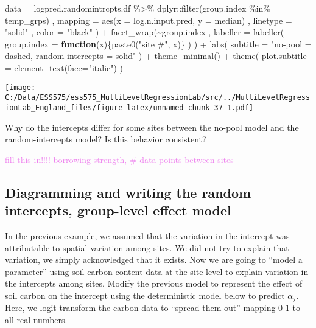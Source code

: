 \documentclass[
]{article}
\newenvironment{Shaded}{\begin{snugshade}}{\end{snugshade}}
\newcommand{\AttributeTok}[1]{\textcolor[rgb]{0.77,0.63,0.00}{#1}}
\newcommand{\ControlFlowTok}[1]{\textcolor[rgb]{0.13,0.29,0.53}{\textbf{#1}}}
\newcommand{\FunctionTok}[1]{\textcolor[rgb]{0.00,0.00,0.00}{#1}}
\newcommand{\NormalTok}[1]{#1}
\newcommand{\SpecialCharTok}[1]{\textcolor[rgb]{0.00,0.00,0.00}{#1}}
\newcommand{\StringTok}[1]{\textcolor[rgb]{0.31,0.60,0.02}{#1}}
\begin{document}
\begin{Shaded}
\begin{Highlighting}[]
    \AttributeTok{data =}\NormalTok{ logpred.randomintrcpts.df }\SpecialCharTok{\%\textgreater{}\%}\NormalTok{ dplyr}\SpecialCharTok{::}\FunctionTok{filter}\NormalTok{(group.index }\SpecialCharTok{\%in\%}\NormalTok{ temp\_grps)}
\NormalTok{    , }\AttributeTok{mapping =} \FunctionTok{aes}\NormalTok{(}\AttributeTok{x =}\NormalTok{ log.n.input.pred, }\AttributeTok{y =}\NormalTok{ median)}
\NormalTok{    , }\AttributeTok{linetype =} \StringTok{"solid"}
\NormalTok{    , }\AttributeTok{color =} \StringTok{"black"}
\NormalTok{  ) }\SpecialCharTok{+}
  \FunctionTok{facet\_wrap}\NormalTok{(}\SpecialCharTok{\textasciitilde{}}\NormalTok{group.index}
\NormalTok{    , }\AttributeTok{labeller =} \FunctionTok{labeller}\NormalTok{(}
        \AttributeTok{group.index =} \ControlFlowTok{function}\NormalTok{(x)\{}\FunctionTok{paste0}\NormalTok{(}\StringTok{"site \#"}\NormalTok{, x)\}}
\NormalTok{      )}
\NormalTok{  ) }\SpecialCharTok{+}
  \FunctionTok{labs}\NormalTok{(}
    \AttributeTok{subtitle =} \StringTok{"no{-}pool = dashed, random{-}intercepts = solid"}
\NormalTok{  ) }\SpecialCharTok{+}
  \FunctionTok{theme\_minimal}\NormalTok{() }\SpecialCharTok{+}
  \FunctionTok{theme}\NormalTok{(}
    \AttributeTok{plot.subtitle =} \FunctionTok{element\_text}\NormalTok{(}\AttributeTok{face=}\StringTok{"italic"}\NormalTok{)}
\NormalTok{  )}
\end{Highlighting}
\end{Shaded}

\texttt{[image: C:/Data/ESS575/ess575\_MultiLevelRegressionLab/src/../MultiLevelRegressionLab\_England\_files/figure-latex/unnamed-chunk-37-1.pdf]}

Why do the intercepts differ for some sites between the no-pool model
and the random-intercepts model? Is this behavior consistent?

\textcolor{violet}{fill this in!!!! borrowing strength, # data points between sites}

\hypertarget{diagramming-and-writing-the-random-intercepts-group-level-effect-model}{%
\subsection{Diagramming and writing the random intercepts, group-level
effect
model}\label{diagramming-and-writing-the-random-intercepts-group-level-effect-model}}

In the previous example, we assumed that the variation in the intercept
was attributable to spatial variation among sites. We did not try to
explain that variation, we simply acknowledged that it exists. Now we
are going to ``model a parameter'' using soil carbon content data at the
site-level to explain variation in the intercepts among sites. Modify
the previous model to represent the effect of soil carbon on the
intercept using the deterministic model below to predict \(\alpha_j\).
Here, we logit transform the carbon data to ``spread them out'' mapping
0-1 to all real numbers.
\end{document}
